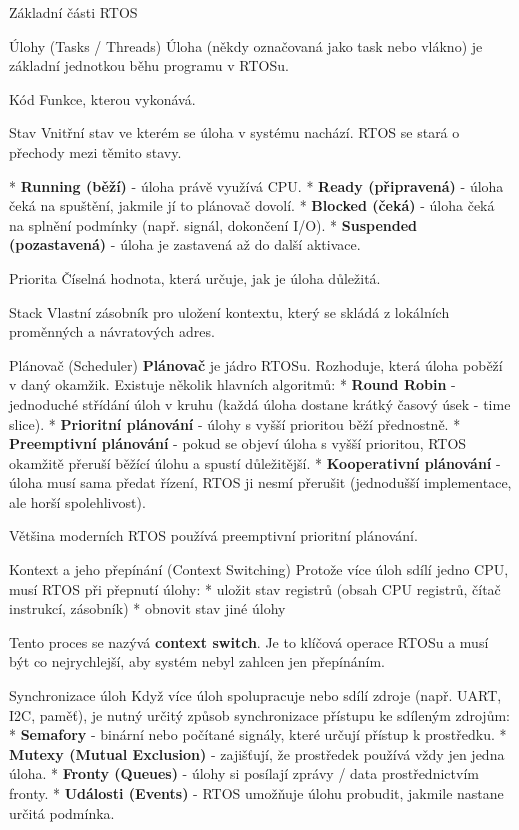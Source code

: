 \chap Základní části RTOS


\sec Úlohy (Tasks / Threads)
Úloha (někdy označovaná jako task nebo vlákno) je základní jednotkou běhu programu v RTOSu.

\secc Kód
Funkce, kterou vykonává.

\secc Stav 
Vnitřní stav ve kterém se úloha v systému nachází. RTOS se stará o přechody mezi těmito stavy.

\begitems
* {\bf Running (běží)} - úloha právě využívá CPU.
* {\bf Ready (připravená)} - úloha čeká na spuštění, jakmile jí to plánovač dovolí.
* {\bf Blocked (čeká)} - úloha čeká na splnění podmínky (např. signál, dokončení I/O).
* {\bf Suspended (pozastavená)} - úloha je zastavená až do další aktivace.
\enditems

\secc Priorita
Číselná hodnota, která určuje, jak je úloha důležitá.

\secc Stack
Vlastní zásobník pro uložení kontextu, který se skládá z lokálních proměnných a návratových adres. 

\sec Plánovač (Scheduler)
{\bf Plánovač} je jádro RTOSu. Rozhoduje, která úloha poběží v daný okamžik. Existuje několik hlavních algoritmů:
\begitems
* {\bf Round Robin} - jednoduché střídání úloh v kruhu (každá úloha dostane krátký časový úsek - time slice).
* {\bf Prioritní plánování} - úlohy s vyšší prioritou běží přednostně.
* {\bf Preemptivní plánování} - pokud se objeví úloha s vyšší prioritou, RTOS okamžitě přeruší běžící úlohu a spustí důležitější.
* {\bf Kooperativní plánování} - úloha musí sama předat řízení, RTOS ji nesmí přerušit (jednodušší implementace, ale horší spolehlivost).
\enditems

Většina moderních RTOS používá preemptivní prioritní plánování.

\sec Kontext a jeho přepínání (Context Switching)
Protože více úloh sdílí jedno CPU, musí RTOS při přepnutí úlohy:
\begitems
* uložit stav registrů (obsah CPU registrů, čítač instrukcí, zásobník)
* obnovit stav jiné úlohy
\enditems

Tento proces se nazývá {\bf context switch}. Je to klíčová operace RTOSu a musí být co nejrychlejší, aby systém nebyl zahlcen jen přepínáním.

\sec Synchronizace úloh
Když více úloh spolupracuje nebo sdílí zdroje (např. UART, I2C, paměť), je nutný určitý způsob synchronizace přístupu ke sdíleným zdrojům:
\begitems
* {\bf Semafory} - binární nebo počítané signály, které určují přístup k prostředku.
* {\bf Mutexy (Mutual Exclusion)} - zajišťují, že prostředek používá vždy jen jedna úloha.
* {\bf Fronty (Queues)} - úlohy si posílají zprávy / data prostřednictvím fronty.
* {\bf Události (Events)} - RTOS umožňuje úlohu probudit, jakmile nastane určitá podmínka.
\enditems

